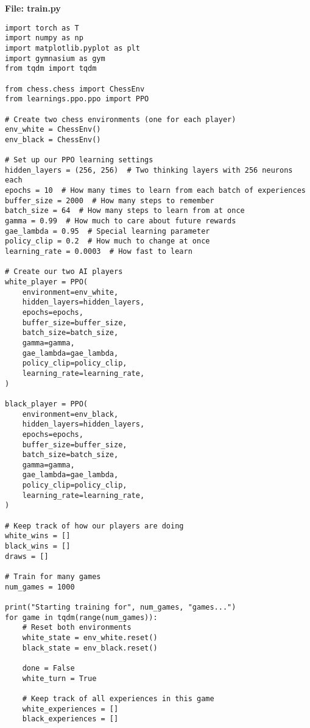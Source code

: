 \documentclass[11pt]{article}
\begin{document}
\begin{tcolorbox}[colback=green!10!white,colframe=green!75!black,title=Complete Training Script,width=\textwidth]
\textbf{File: train.py}
\begin{minipage}{0.48\textwidth}
\begin{lstlisting}[style=Python,basicstyle=\ttfamily\scriptsize]
import torch as T
import numpy as np
import matplotlib.pyplot as plt
import gymnasium as gym
from tqdm import tqdm

from chess.chess import ChessEnv
from learnings.ppo.ppo import PPO

# Create two chess environments (one for each player)
env_white = ChessEnv()
env_black = ChessEnv()

# Set up our PPO learning settings
hidden_layers = (256, 256)  # Two thinking layers with 256 neurons each
epochs = 10  # How many times to learn from each batch of experiences
buffer_size = 2000  # How many steps to remember
batch_size = 64  # How many steps to learn from at once
gamma = 0.99  # How much to care about future rewards
gae_lambda = 0.95  # Special learning parameter
policy_clip = 0.2  # How much to change at once
learning_rate = 0.0003  # How fast to learn

# Create our two AI players
white_player = PPO(
    environment=env_white,
    hidden_layers=hidden_layers,
    epochs=epochs,
    buffer_size=buffer_size,
    batch_size=batch_size,
    gamma=gamma,
    gae_lambda=gae_lambda,
    policy_clip=policy_clip,
    learning_rate=learning_rate,
)

black_player = PPO(
    environment=env_black,
    hidden_layers=hidden_layers,
    epochs=epochs,
    buffer_size=buffer_size,
    batch_size=batch_size,
    gamma=gamma,
    gae_lambda=gae_lambda,
    policy_clip=policy_clip,
    learning_rate=learning_rate,
)

# Keep track of how our players are doing
white_wins = []
black_wins = []
draws = []

# Train for many games
num_games = 1000

print("Starting training for", num_games, "games...")
for game in tqdm(range(num_games)):
    # Reset both environments
    white_state = env_white.reset()
    black_state = env_black.reset()
    
    done = False
    white_turn = True
    
    # Keep track of all experiences in this game
    white_experiences = []
    black_experiences = []
    

\end{lstlisting}
\end{minipage}
\end{tcolorbox}
\end{document}
